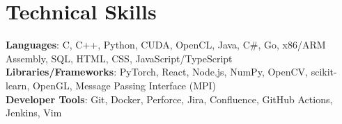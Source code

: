 \documentclass[letterpaper, 10pt]{article}
\begin{document}
\section{Technical Skills}
 \vspace{4pt}
 \begin{itemize}[leftmargin=0.15in, label={}]
    \small{\item{
     \textbf{Languages}{: C, C++, Python, CUDA, OpenCL, Java, C\#, Go, x86/ARM Assembly, SQL, HTML, CSS, JavaScript/TypeScript } \\
     \textbf{Libraries/Frameworks}{: PyTorch, React, Node.js, NumPy,  OpenCV, scikit-learn, OpenGL, Message Passing Interface (MPI) } \\
     \textbf{Developer Tools}{: Git, Docker, Perforce, Jira, Confluence, GitHub Actions, Jenkins, Vim} \\
    }}
 \end{itemize}

\end{document}
